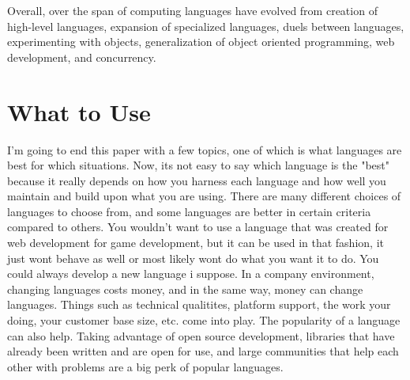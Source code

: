 \documentclass[letterpaper, 10 pt, conference]{IEEEtran}
\begin{document}
\indent Overall, over the span of computing languages have evolved from creation of high-level languages, expansion of specialized languages, duels between languages, experimenting with objects, generalization of object oriented programming, web development, and concurrency. 


\section{What to Use}
\indent I'm going to end this paper with a few topics, one of which is what languages are best for which situations. Now, its not easy to say which language is the "best" because it really depends on how you harness each language and how well you maintain and build upon what you are using. There are many different choices of languages to choose from, and some languages are better in certain criteria compared to others. You wouldn't want to use a language that was created for web development for game development, but it can be used in that fashion, it just wont behave as well or most likely wont do what you want it to do. You could always develop a new language i suppose. In a company environment, changing languages costs money, and in the same way, money can change languages. Things such as technical qualitites, platform support, the work your doing, your customer base size, etc. come into play. The popularity of a language can also help. Taking advantage of open source development, libraries that have already been written and are open for use, and large communities that help each other with problems are a big perk of popular languages. 
\newline
\end{document}
